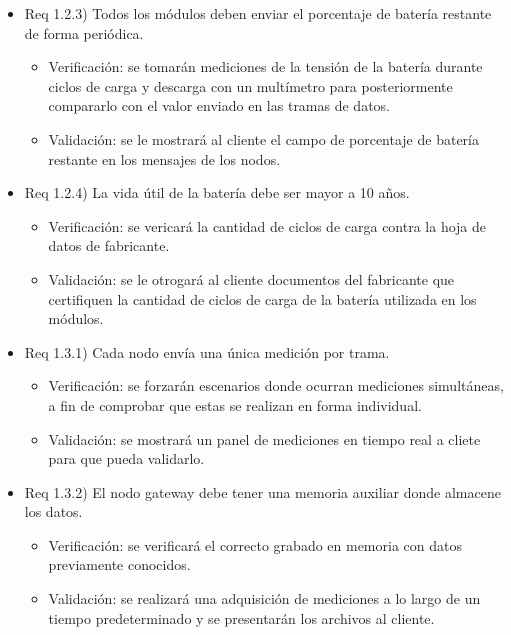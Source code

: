 \documentclass[
11pt, %
codirector, %
]{charter}
\begin{document}
\begin{itemize}
\item Req 1.2.3) Todos los módulos deben enviar el porcentaje de batería restante de forma periódica.

\begin{itemize}
	\item Verificación: se tomarán mediciones de la tensión de la batería durante ciclos de carga y descarga con un multímetro para posteriormente compararlo con el valor enviado en las tramas de datos. 
	\item Validación: se le mostrará al cliente el campo de porcentaje de batería restante en los mensajes de los nodos.
\end{itemize}

\item Req 1.2.4) La vida útil de la batería debe ser mayor a 10 años.

\begin{itemize}
	\item Verificación: se vericará la cantidad de ciclos de carga contra la hoja de datos de fabricante.
	\item Validación: se le otrogará al cliente documentos del fabricante que certifiquen la cantidad de ciclos de carga de la batería utilizada en los módulos.
\end{itemize}

\item Req 1.3.1) Cada nodo envía una única medición por trama.

\begin{itemize}
	\item Verificación: se forzarán escenarios donde ocurran mediciones simultáneas, a fin de comprobar que estas se realizan en forma individual.
	\item Validación: se mostrará un panel de mediciones en tiempo real a cliete para que pueda validarlo.
\end{itemize}

\item Req 1.3.2) El nodo gateway debe tener una memoria auxiliar donde almacene los datos.

\begin{itemize}
	\item Verificación: se verificará el correcto grabado en memoria con datos previamente conocidos.
	\item Validación: se realizará una adquisición de mediciones a lo largo de un tiempo predeterminado y se presentarán los archivos al cliente.
\end{itemize}


\end{itemize}
\end{document}
